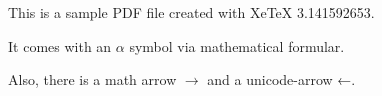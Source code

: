 \documentclass{minimal}
\begin{document}
This is a sample PDF file created with XeTeX 3.141592653.

It comes with an $\alpha$ symbol via mathematical formular. 

Also, there is a math arrow $\rightarrow$ and a unicode-arrow ←.
\end{document}
